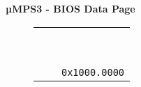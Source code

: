 \documentclass{beamer}
\begin{document}
\begin{frame}
\begin{center}
\begin{minipage}{0.47\textwidth}
\begin{block}{\textbf{{\small µMPS3 - BIOS Data Page}}}
\begin{figure}[h]
\begin{tabular}{rcl}
						\multicolumn{1}{l|}{\multirow{20}{*}{\rotatebox{90}{{\small~~~~~BIOS}}}} & \multicolumn{1}{c|}{\cellcolor{nord9}}                                                         &                                               \\
						\multicolumn{1}{l|}{}                                                    & \multicolumn{1}{c|}{\cellcolor{nord9}}                                                         &                                               \\
						\multicolumn{1}{l|}{}                                                    & \multicolumn{1}{c|}{\cellcolor{nord9}}                                                         &                                               \\
						\multicolumn{1}{l|}{}                                                    & \multicolumn{1}{c|}{\cellcolor{nord9}}                                                         &                                               \\
						\multicolumn{1}{l|}{}                                                    & \multicolumn{1}{c|}{\cellcolor{nord9}}                                                         &                                               \\
						\multicolumn{1}{l|}{}                                                    & \multicolumn{1}{c|}{\cellcolor{nord9}}                                                         &                                               \\
						\multicolumn{1}{l|}{}                                                    & \multicolumn{1}{c|}{\cellcolor{nord9}}                                                         &                                               \\
						\multicolumn{1}{l|}{}                                                    & \multicolumn{1}{c|}{\cellcolor{nord9}}                                                         &                                               \\
						\multicolumn{1}{l|}{}                                                    & \multicolumn{1}{c|}{\cellcolor{nord9}}                                                         &                                               \\
						\multicolumn{1}{l|}{}                                                    & \multicolumn{1}{c|}{\cellcolor{nord9}}                                                         & \multirow{2}{*}{\texttt{{\tiny 0x1000.0000}}} \\ \hhline{~-~}

\end{tabular}
\end{figure}
\end{block}
\end{minipage}
\end{center}
\end{frame}
\end{document}
